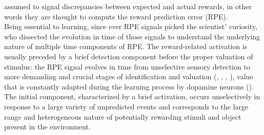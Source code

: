 assumed to signal discrepancies between expected and actual rewards, in other words they are thought to compute the reward prediction error (RPE).\\Being essential to learning, since ever RPE signals picked the scientist$'$ curiosity, who dissected the evolution in time of those signals to understand the underlying nature of multiple time components of RPE. The reward-related activation is usually preceded by a brief detection component before the proper valuation of stimulus: the RPE signal evolves in time from unselective sensory detection to more demanding and crucial stages of identification and valuation (\cite{Tobler2003}, \cite{Nomoto2010}, \cite{Fiorillo2013}, \cite{Schultz2016}), value that is constantly adapted during the learning process by dopamine neurons (\cite{Tobler2005}). The initial component, characterized by a brief activation, occurs unselectively in response to a large variety of unpredicted events and corresponds to the large range and heterogeneous nature of potentially rewarding stimuli and object present in the environment.
